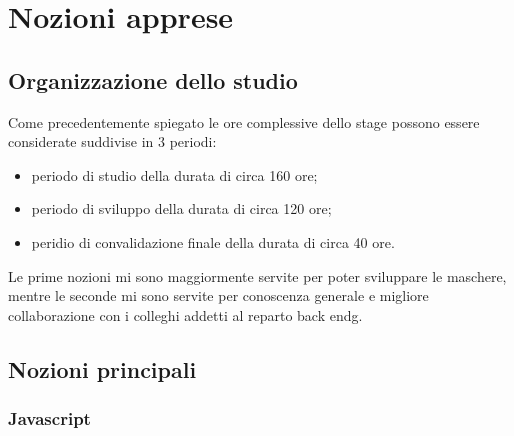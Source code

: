 
\chapter{Nozioni apprese}
\label{cap:nozioni-apprese}


\section{Organizzazione dello studio}

Come precedentemente spiegato le ore complessive dello stage possono essere considerate suddivise in 3 periodi:
\begin{itemize}
	\item periodo di studio della durata di circa 160 ore;
	\item periodo di sviluppo della durata di circa 120 ore;
	\item peridio di convalidazione finale della durata di circa 40 ore.
\end{itemize}
Le prime nozioni mi sono maggiormente servite per poter sviluppare le maschere, mentre le seconde mi sono servite per conoscenza generale e migliore collaborazione con i colleghi addetti al reparto \gls{back endg}.

\section{Nozioni principali}

\subsection{Javascript}

